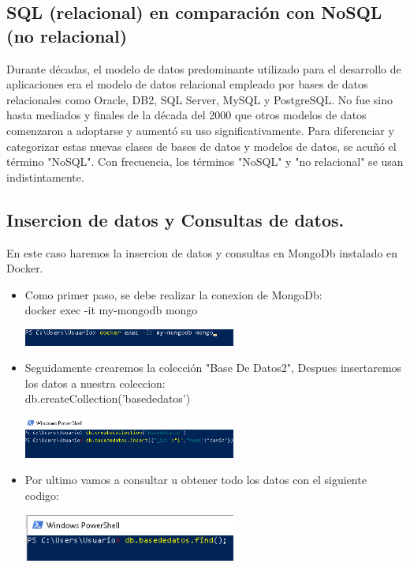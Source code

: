 \documentclass[twoside,twocolumn]{article}
\begin{document}
\subsection{SQL (relacional) en comparación con NoSQL (no relacional)}

Durante décadas, el modelo de datos predominante utilizado para el desarrollo de aplicaciones era el modelo de datos relacional empleado por bases de datos relacionales como Oracle, DB2, SQL Server, MySQL y PostgreSQL. No fue sino hasta mediados y finales de la década del 2000 que otros modelos de datos comenzaron a adoptarse y aumentó su uso significativamente. Para diferenciar y categorizar estas nuevas clases de bases de datos y modelos de datos, se acuñó el término "NoSQL". Con frecuencia, los términos "NoSQL" y "no relacional" se usan indistintamente.



\subsection{Insercion de datos y Consultas de datos.}
En este caso haremos la insercion de datos y consultas en MongoDb instalado en Docker.
\begin{itemize}
\item Como primer paso, se debe realizar la conexion de MongoDb:\\
docker exec -it my-mongodb mongo
\begin{center}
	\includegraphics[width=7cm]{./Imagenes/ins1} 
	\end{center}
\item Seguidamente crearemos la colección "Base De Datos2", Despues insertaremos los datos a nuestra coleccion:\\
db.createCollection('basededatos')  
\begin{center}
	\includegraphics[width=7cm]{./Imagenes/ins2} 
	\end{center}

\item Por ultimo vamos a consultar u obtener todo los datos con el siguiente codigo:\\

\begin{center}
	\includegraphics[width=7cm]{./Imagenes/ins3} 
	\end{center}
\end{itemize} 
\end{document}

